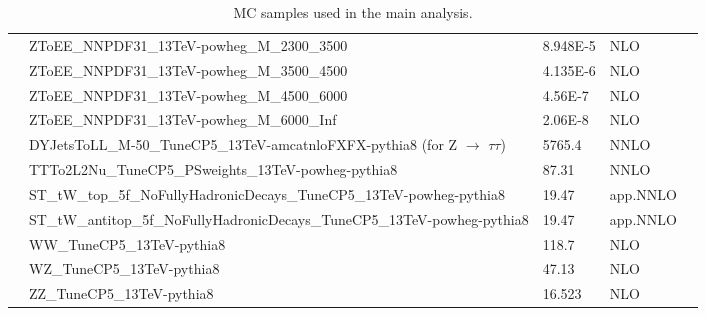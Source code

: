 \begin{table}[htp]
\begin{center}
{\begin{tabular}{|c|l|l|l|l|}
&ZToEE\_NNPDF31\_13TeV-powheg\_M\_2300\_3500              & 8.948E-5      & NLO                 \\
&ZToEE\_NNPDF31\_13TeV-powheg\_M\_3500\_4500              & 4.135E-6      & NLO                 \\
&ZToEE\_NNPDF31\_13TeV-powheg\_M\_4500\_6000             & 4.56E-7      & NLO                \\
&ZToEE\_NNPDF31\_13TeV-powheg\_M\_6000\_Inf              & 2.06E-8      & NLO                 \\
&DYJetsToLL\_M-50\_TuneCP5\_13TeV-amcatnloFXFX-pythia8 (for Z $\rightarrow$ $\tau\tau$) & 5765.4       & NNLO             \\\cline{2-4}
&TTTo2L2Nu\_TuneCP5\_PSweights\_13TeV-powheg-pythia8        & 87.31        & NNLO                      \\
&ST\_tW\_top\_5f\_NoFullyHadronicDecays\_TuneCP5\_13TeV-powheg-pythia8         & 19.47         & app.NNLO           \\
&ST\_tW\_antitop\_5f\_NoFullyHadronicDecays\_TuneCP5\_13TeV-powheg-pythia8     & 19.47         & app.NNLO           \\\cline{2-4}
&WW\_TuneCP5\_13TeV-pythia8                                         & 118.7        & NLO                      \\
&WZ\_TuneCP5\_13TeV-pythia8                                         & 47.13        & NLO                      \\
&ZZ\_TuneCP5\_13TeV-pythia8                                         & 16.523       & NLO                      \\\hline
\end{tabular}}
\caption{MC samples used in the main analysis.}
\label{tab:Z_mc-samples_1}
  \end{center}
\end{table}



